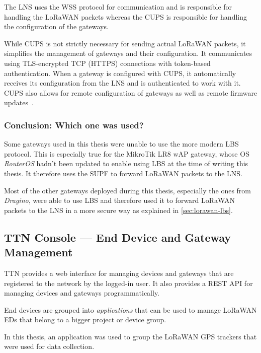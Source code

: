 The \ac{LNS} uses the \ac{WSS} protocol for communication and is responsible for handling the \ac{LoRaWAN} packets whereas the \acl{CUPS} is responsible for handling the configuration of the gateways.

While \ac{CUPS} is not strictly necessary for sending actual \ac{LoRaWAN} packets, it simplifies the management of gateways and their configuration.
It communicates using \ac{TLS}-encrypted \ac{TCP} (\ac{HTTPS}) connections with token-based authentication.
When a gateway is configured with \ac{CUPS}, it automatically receives its configuration from the \ac{LNS} and is authenticated to work with it.
\ac{CUPS} also allows for remote configuration of gateways as well as remote firmware updates~\cite{the_things_industries_bv_lora_2022}.

\subsubsection{Conclusion: Which one was used?}

Some gateways used in this thesis were unable to use the more modern \acl{LBS} protocol.
This is especially true for the MikroTik LR8 wAP gateway, whose \ac{OS} \emph{RouterOS} hadn't been updated to enable using \ac{LBS} at the time of writing this thesis.
It therefore uses the \ac{SUPF} to forward \ac{LoRaWAN} packets to the \ac{LNS}.

Most of the other gateways deployed during this thesis, especially the ones from \emph{Dragino}, were able to use \ac{LBS} and therefore used it to forward \ac{LoRaWAN} packets to the \ac{LNS} in a more secure way as explained in \cref{sec:lorawan-lbs}.

\subsection{\acl{TTN} Console — End Device and Gateway Management}\label{sec:web-interface-and-device-gateway-management}

\ac{TTN} provides a web interface for managing devices and gateways that are registered to the network by the logged-in user.
It also provides a \ac{REST} \ac{API} for managing devices and gateways programmatically.

End devices are grouped into \emph{applications} that can be used to manage \ac{LoRaWAN} \aclp{ED} that belong to a bigger project or device group.

In this thesis, an application was used to group the \ac{LoRaWAN} \ac{GPS} trackers that were used for data collection.

